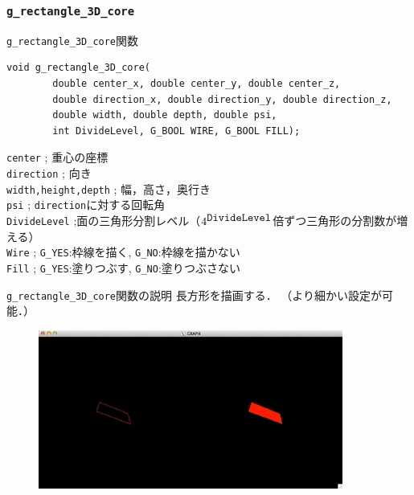 \documentclass[platex,a4paper,12pt]{jsarticle}%
\begin{document}


\clearpage
\subsubsection{\texttt{g\_rectangle\_3D\_core}}

\begin{itembox}[l]{\texttt{g\_rectangle\_3D\_core}関数}
\begin{verbatim}
void g_rectangle_3D_core(
        double center_x, double center_y, double center_z,
        double direction_x, double direction_y, double direction_z,
        double width, double depth, double psi,
        int DivideLevel, G_BOOL WIRE, G_BOOL FILL);
\end{verbatim}
\verb|center| ; 重心の座標\\
\verb|direction| ; 向き\\
\verb|width,height,depth| ; 幅，高さ，奥行き\\
\verb|psi| ; \verb|direction|に対する回転角\\
\verb|DivideLevel| ;面の三角形分割レベル（$4^{\verb|DivideLevel|}$倍ずつ三角形の分割数が増える）\\
\verb|Wire| ; \verb|G_YES|:枠線を描く, \verb|G_NO|:枠線を描かない \\
\verb|Fill| ; \verb|G_YES|:塗りつぶす, \verb|G_NO|:塗りつぶさない 
\end{itembox}

\begin{itembox}[l]{\texttt{g\_rectangle\_3D\_core}関数の説明}
長方形を描画する．
（より細かい設定が可能．）
\end{itembox}

\begin{figure}[htb]
\centering
	\includegraphics[width=100mm]{Canvas_g_rectangle.eps}
\end{figure}
\end{document}
